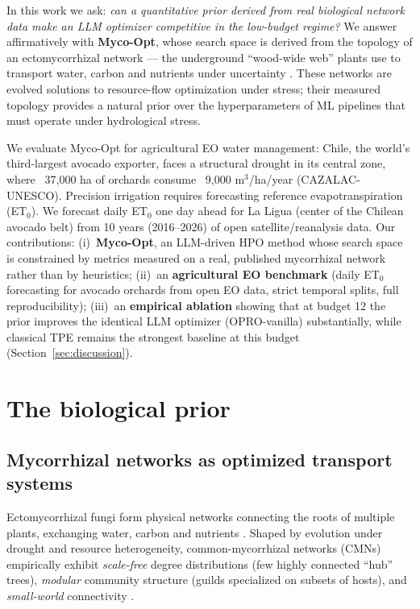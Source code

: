 \documentclass[11pt]{article}
\begin{document}
In this work we ask: \emph{can a quantitative prior derived from real
biological network data make an LLM optimizer competitive in the low-budget
regime?} We answer affirmatively with \textbf{Myco-Opt}, whose search space is
derived from the topology of an ectomycorrhizal network --- the underground
``wood-wide web'' plants use to transport water, carbon and nutrients under
uncertainty \citep{simard1997,beiler2010}. These networks are evolved solutions
to resource-flow optimization under stress; their measured topology provides a
natural prior over the hyperparameters of ML pipelines that must operate under
hydrological stress.

We evaluate Myco-Opt for agricultural EO water management: Chile, the world's
third-largest avocado exporter, faces a structural drought in its central zone,
where ~37{,}000 ha of orchards consume ~9{,}000 m$^3$/ha/year
(CAZALAC-UNESCO). Precision irrigation requires forecasting reference
evapotranspiration (ET$_0$). We forecast daily ET$_0$ one day ahead for La
Ligua (center of the Chilean avocado belt) from 10 years (2016--2026) of open
satellite/reanalysis data. Our contributions: (i)~\textbf{Myco-Opt}, an LLM-driven HPO method whose
search space is constrained by metrics measured on a real, published
mycorrhizal network rather than by heuristics; (ii)~an \textbf{agricultural EO
benchmark} (daily ET$_0$ forecasting for avocado orchards from open EO data,
strict temporal splits, full reproducibility); (iii)~an \textbf{empirical
ablation} showing that at budget 12 the prior improves the identical LLM
optimizer (OPRO-vanilla) substantially, while classical TPE remains the
strongest baseline at this budget (Section~\ref{sec:discussion}).

\section{The biological prior}
\label{sec:prior}

\subsection{Mycorrhizal networks as optimized transport systems}
\label{sec:biology}

Ectomycorrhizal fungi form physical networks connecting the roots of multiple
plants, exchanging water, carbon and nutrients \citep{simard1997}. Shaped by
evolution under drought and resource heterogeneity, common-mycorrhizal networks
(CMNs) empirically exhibit \emph{scale-free} degree distributions (few highly
connected ``hub'' trees), \emph{modular} community structure (guilds
specialized on subsets of hosts), and \emph{small-world} connectivity
\citep{beiler2010,southworth2014}.
\end{document}
